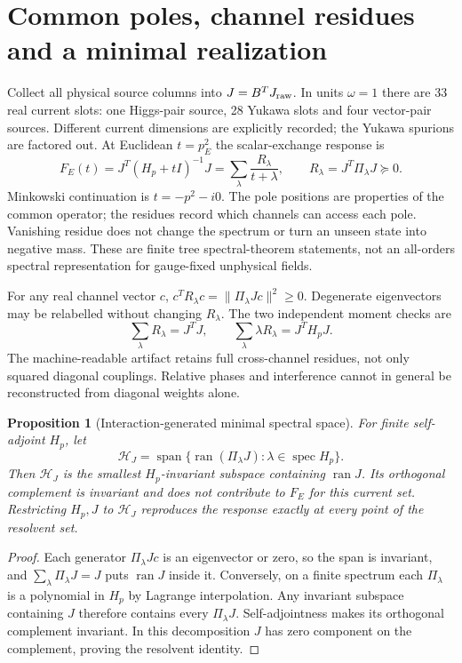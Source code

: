 \documentclass[11pt]{article}
\newcommand{\ran}{\operatorname{ran}}
\newcommand{\Span}{\operatorname{span}}
\newcommand{\HH}{\mathcal H}
\newtheorem{proposition}{Proposition}
\begin{document}
\section{Common poles, channel residues and a minimal realization}
Collect all physical source columns into $J=B^TJ_{\rm raw}$.
In units $\omega=1$ there are 33 real current slots: one Higgs-pair
source, 28 Yukawa slots and four vector-pair sources. Different current
dimensions are explicitly recorded; the Yukawa spurions are factored
out. At Euclidean $t=p_E^2$ the scalar-exchange response is
\begin{equation}
 F_E(t)=J^T(H_p+tI)^{-1}J
       =\sum_\lambda\frac{R_\lambda}{t+\lambda},\qquad
 R_\lambda=J^T\Pi_\lambda J\succeq0. \label{eq:spectral}
\end{equation}
Minkowski continuation is $t=-p^2-i0$. The pole positions are properties
of the common operator; the residues record which channels can access
each pole. Vanishing residue does not change the spectrum or turn an
unseen state into negative mass. These are finite tree spectral-theorem
statements, not an all-orders spectral representation for gauge-fixed
unphysical fields.

For any real channel vector $c$,
$c^TR_\lambda c=\|\Pi_\lambda Jc\|^2\geq0$. Degenerate eigenvectors may
be relabelled without changing $R_\lambda$. The two independent moment
checks are
\begin{equation}
 \sum_\lambda R_\lambda=J^TJ,\qquad
 \sum_\lambda\lambda R_\lambda=J^TH_pJ. \label{eq:moments}
\end{equation}
The machine-readable artifact retains full cross-channel residues,
not only squared diagonal couplings. Relative phases and interference
cannot in general be reconstructed from diagonal weights alone.

\begin{proposition}[Interaction-generated minimal spectral space]
For finite self-adjoint $H_p$, let
\begin{equation}
 \HH_J=\Span\{\ran(\Pi_\lambda J):\lambda\in\operatorname{spec}H_p\}.
\end{equation}
Then $\HH_J$ is the smallest $H_p$-invariant subspace containing
$\ran J$. Its orthogonal complement is invariant and does not contribute
to $F_E$ for this current set. Restricting $H_p,J$ to $\HH_J$ reproduces
the response exactly at every point of the resolvent set.
\end{proposition}
\begin{proof}
Each generator $\Pi_\lambda Jc$ is an eigenvector or zero, so the span
is invariant, and $\sum_\lambda\Pi_\lambda J=J$ puts $\ran J$ inside it.
Conversely, on a finite spectrum each $\Pi_\lambda$ is a polynomial in
$H_p$ by Lagrange interpolation. Any invariant subspace containing $J$
therefore contains every $\Pi_\lambda J$. Self-adjointness makes its
orthogonal complement invariant. In this decomposition $J$ has zero
component on the complement, proving the resolvent identity.
\end{proof}
\end{document}

